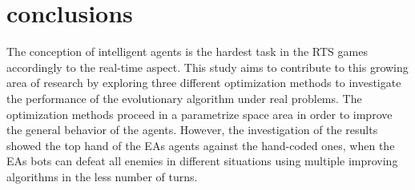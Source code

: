 \documentclass[]{interact}
\theoremstyle{plain}%
\theoremstyle{definition}
\theoremstyle{remark}
\begin{document}

\section{conclusions}
The conception of intelligent agents is the hardest task in the RTS games accordingly to the real-time aspect. This study aims to contribute to this growing area of research by exploring three different optimization methods to investigate the performance of the evolutionary algorithm under real problems. The optimization methods proceed in a parametrize space area in order to improve the general behavior of the agents. However, the investigation of the results showed the top hand of the EAs agents against the hand-coded ones, when the EAs bots can defeat all enemies in different situations using multiple improving algorithms in the less number of turns.





\end{document}
